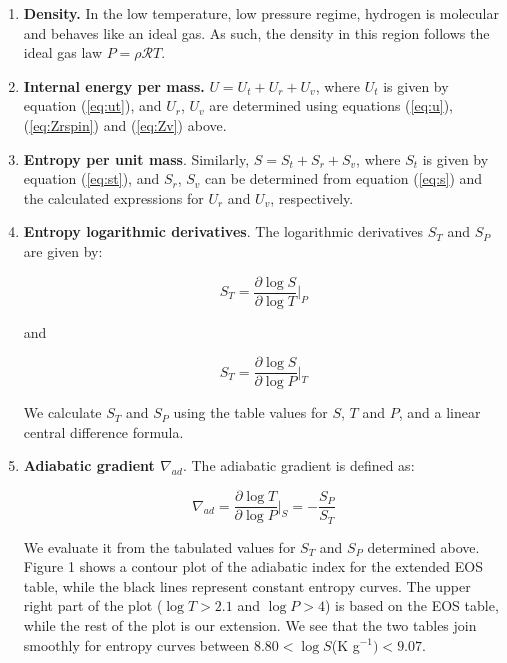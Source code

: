 \documentclass[apj]{emulateapj}
\begin{document}
\begin{enumerate}

\item{\textbf{Density.}} In the low temperature, low pressure regime, hydrogen is molecular and behaves like an ideal gas. As such, the density in this region follows the ideal gas law $P=\rho \mathcal{R} T$.
\item{\textbf{Internal energy per mass.}} $U=U_t+U_r+U_v$, where $U_t$ is given by equation (\ref{eq:ut}), and $U_r$, $U_v$ are determined using equations (\ref{eq:u}), (\ref{eq:Zrspin}) and (\ref{eq:Zv}) above.
\item{\textbf{Entropy per unit mass}}. Similarly, $S=S_t+S_r+S_v$, where $S_t$ is given by equation (\ref{eq:st}), and $S_r$, $S_v$ can be determined from equation (\ref{eq:s}) and the calculated expressions for $U_r$ and $U_v$, respectively.
\item{\textbf{Entropy logarithmic derivatives}}. The logarithmic derivatives $S_T$ and $S_P$ are given by:

\begin{equation}
\label{eq:sT}
S_T=\frac{\partial \log{S}}{\partial \log{T}} \Big |_P
\end{equation}

\noindent and

\begin{equation}
\label{eq:sP}
S_T=\frac{\partial \log{S}}{\partial \log{P}} \Big |_T
\end{equation}

We calculate $S_T$ and $S_P$ using the table values for $S$, $T$ and $P$, and a linear central difference formula. 

\item{\textbf{Adiabatic gradient $\nabla_{ad}$}}. The adiabatic gradient is defined as:

\begin{equation}
\label{eq:delad}
\nabla_{ad}=\frac{\partial \log{T}}{\partial \log{P}} \Big |_S = -\frac{S_P}{S_T}
\end{equation}

We evaluate it from the tabulated values for $S_T$ and $S_P$ determined above. Figure 1 shows a contour plot of the adiabatic index for the extended EOS table, while the black lines represent constant entropy curves. The upper right part of the plot ($\log T>2.1$ and $\log P>4$) is based on the \cite{saumon95} EOS table, while the rest of the plot is our extension. We see that the two tables join smoothly for entropy curves between $8.80<\log{S}$(K g$^{-1})<9.07$.

\end{enumerate}
\end{document}
